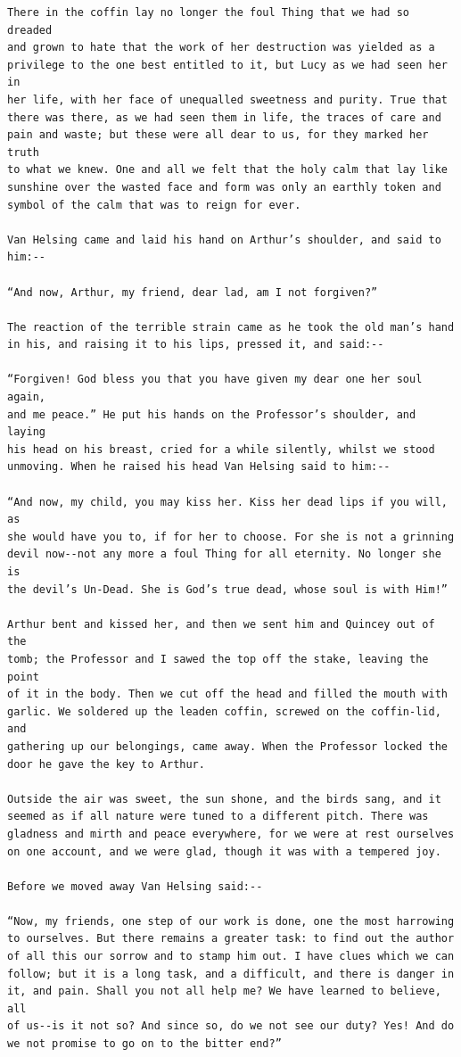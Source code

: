 \documentclass{article}
\begin{document}
\begin{verbatim}
There in the coffin lay no longer the foul Thing that we had so dreaded
and grown to hate that the work of her destruction was yielded as a
privilege to the one best entitled to it, but Lucy as we had seen her in
her life, with her face of unequalled sweetness and purity. True that
there was there, as we had seen them in life, the traces of care and
pain and waste; but these were all dear to us, for they marked her truth
to what we knew. One and all we felt that the holy calm that lay like
sunshine over the wasted face and form was only an earthly token and
symbol of the calm that was to reign for ever.

Van Helsing came and laid his hand on Arthur’s shoulder, and said to
him:--

“And now, Arthur, my friend, dear lad, am I not forgiven?”

The reaction of the terrible strain came as he took the old man’s hand
in his, and raising it to his lips, pressed it, and said:--

“Forgiven! God bless you that you have given my dear one her soul again,
and me peace.” He put his hands on the Professor’s shoulder, and laying
his head on his breast, cried for a while silently, whilst we stood
unmoving. When he raised his head Van Helsing said to him:--

“And now, my child, you may kiss her. Kiss her dead lips if you will, as
she would have you to, if for her to choose. For she is not a grinning
devil now--not any more a foul Thing for all eternity. No longer she is
the devil’s Un-Dead. She is God’s true dead, whose soul is with Him!”

Arthur bent and kissed her, and then we sent him and Quincey out of the
tomb; the Professor and I sawed the top off the stake, leaving the point
of it in the body. Then we cut off the head and filled the mouth with
garlic. We soldered up the leaden coffin, screwed on the coffin-lid, and
gathering up our belongings, came away. When the Professor locked the
door he gave the key to Arthur.

Outside the air was sweet, the sun shone, and the birds sang, and it
seemed as if all nature were tuned to a different pitch. There was
gladness and mirth and peace everywhere, for we were at rest ourselves
on one account, and we were glad, though it was with a tempered joy.

Before we moved away Van Helsing said:--

“Now, my friends, one step of our work is done, one the most harrowing
to ourselves. But there remains a greater task: to find out the author
of all this our sorrow and to stamp him out. I have clues which we can
follow; but it is a long task, and a difficult, and there is danger in
it, and pain. Shall you not all help me? We have learned to believe, all
of us--is it not so? And since so, do we not see our duty? Yes! And do
we not promise to go on to the bitter end?”


\end{verbatim}
\end{document}
